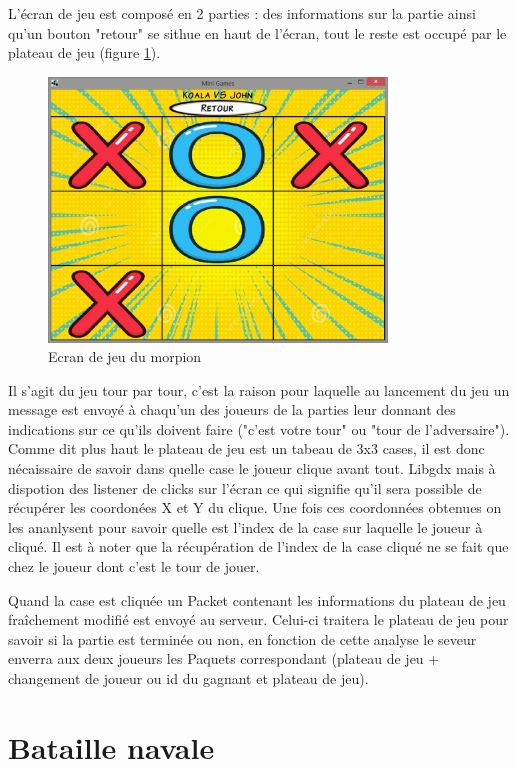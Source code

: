 \documentclass{report}
\begin{document}
L'écran de jeu est composé en 2 parties : des informations sur la partie ainsi qu'un bouton "retour" se sithue en haut
de l'écran, tout le reste est occupé par le plateau de jeu (figure \ref{morpion_en_jeu}).

\begin{figure}[H]
	\centering\includegraphics[width=9cm]{morpioningame}
	\caption{Ecran de jeu du morpion}
  \label{morpion_en_jeu}
\end{figure}

Il s'agit du jeu tour par tour, c'est la raison pour laquelle au lancement du jeu un message est envoyé à chaqu'un des joueurs de la parties
leur donnant des indications sur ce qu'ils doivent faire ("c'est votre tour" ou "tour de l'adversaire").
Comme dit plus haut le plateau de jeu est un tabeau de 3x3 cases, il est donc nécaissaire
de savoir dans quelle case le joueur clique avant tout. Libgdx mais à dispotion des listener de clicks sur l'écran ce qui signifie qu'il sera possible
de récupérer les coordonées X et Y du clique. Une fois ces coordonnées obtenues on les ananlysent pour savoir quelle est l'index de la case sur laquelle
le joueur à cliqué. Il est à noter que la récupération de l'index de la case cliqué ne se fait que chez le joueur dont c'est le tour de jouer.

Quand la case est cliquée un Packet contenant les informations du plateau de jeu fraîchement modifié est envoyé au serveur. Celui-ci traitera le plateau de jeu
pour savoir si la partie est terminée ou non, en fonction de cette analyse le seveur enverra aux deux joueurs les Paquets correspondant (plateau de jeu +
 changement de joueur ou id du gagnant et plateau de jeu).

\section{Bataille navale}
\label{Bataille navale}
\end{document}

